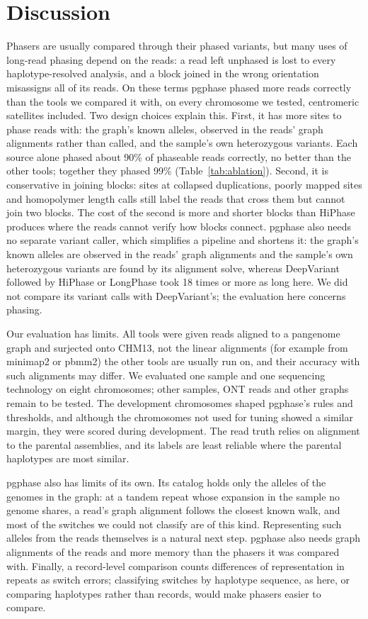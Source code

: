 \section{Discussion}

Phasers are usually compared through their phased variants, but many uses of long-read phasing depend on the reads: a read left unphased is lost to every haplotype-resolved analysis, and a block joined in the wrong orientation misassigns all of its reads. On these terms pgphase phased more reads correctly than the tools we compared it with, on every chromosome we tested, centromeric satellites included. Two design choices explain this. First, it has more sites to phase reads with: the graph's known alleles, observed in the reads' graph alignments rather than called, and the sample's own heterozygous variants. Each source alone phased about 90\% of phaseable reads correctly, no better than the other tools; together they phased 99\% (Table~\ref{tab:ablation}). Second, it is conservative in joining blocks: sites at collapsed duplications, poorly mapped sites and homopolymer length calls still label the reads that cross them but cannot join two blocks. The cost of the second is more and shorter blocks than HiPhase produces where the reads cannot verify how blocks connect. pgphase also needs no separate variant caller, which simplifies a pipeline and shortens it: the graph's known alleles are observed in the reads' graph alignments and the sample's own heterozygous variants are found by its alignment solve, whereas DeepVariant followed by HiPhase or LongPhase took 18 times or more as long here. We did not compare its variant calls with DeepVariant's; the evaluation here concerns phasing.

Our evaluation has limits. All tools were given reads aligned to a pangenome graph and surjected onto CHM13, not the linear alignments (for example from minimap2 or pbmm2) the other tools are usually run on, and their accuracy with such alignments may differ. We evaluated one sample and one sequencing technology on eight chromosomes; other samples, ONT reads and other graphs remain to be tested. The development chromosomes shaped pgphase's rules and thresholds, and although the chromosomes not used for tuning showed a similar margin, they were scored during development. The read truth relies on alignment to the parental assemblies, and its labels are least reliable where the parental haplotypes are most similar.

pgphase also has limits of its own. Its catalog holds only the alleles of the genomes in the graph: at a tandem repeat whose expansion in the sample no genome shares, a read's graph alignment follows the closest known walk, and most of the switches we could not classify are of this kind. Representing such alleles from the reads themselves is a natural next step. pgphase also needs graph alignments of the reads and more memory than the phasers it was compared with. Finally, a record-level comparison counts differences of representation in repeats as switch errors; classifying switches by haplotype sequence, as here, or comparing haplotypes rather than records, would make phasers easier to compare.
